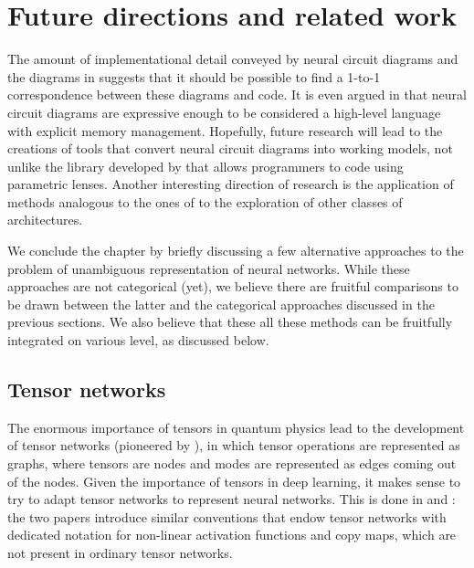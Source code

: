 \documentclass[11pt,a4paper,openright,twoside]{report}
\theoremstyle{plain}
\theoremstyle{definition}
\begin{document}
\section{Future directions and related work}

The amount of implementational detail conveyed by neural circuit diagrams and the diagrams in \cite{khatri2024anatomy} suggests that it should be possible to find a 1-to-1 correspondence between these diagrams and code. It is even argued in \cite{abbott2023robust} that neural circuit diagrams are expressive enough to be considered a high-level language with explicit memory management. Hopefully, future research will lead to the creations of tools that convert neural circuit diagrams into working models, not unlike the library developed by \cite{cruttwell2022categorical} that allows programmers to code using parametric lenses. Another interesting direction of research is the application of methods analogous to the ones of \cite{khatri2024anatomy} to the exploration of other classes of architectures.

We conclude the chapter by briefly discussing a few alternative approaches to the problem of unambiguous representation of neural networks. While these approaches are not categorical (yet), we believe there are fruitful comparisons to be drawn between the latter and the categorical approaches discussed in the previous sections. We also believe that these all these methods can be fruitfully integrated on various level, as discussed below.

\subsection{Tensor networks}

The enormous importance of tensors in quantum physics lead to the development of tensor networks (pioneered by \cite{penrose1971applications}), in which tensor operations are represented as graphs, where tensors are nodes and modes are represented as edges coming out of the nodes. Given the importance of tensors in deep learning, it makes sense to try to adapt tensor networks to represent neural networks. This is done in \cite{xu2023graph} and \cite{taylor2024introduction}: the two papers introduce similar conventions that endow tensor networks with dedicated notation for non-linear activation functions and copy maps, which are not present in ordinary tensor networks. 
\end{document}
